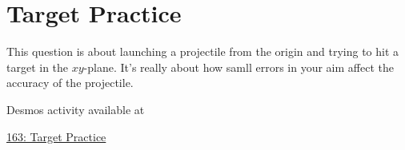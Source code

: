 \documentclass{ximera}
\begin{document}
\section{Target Practice}

\begin{question} \label{Qpdf93r}

This question is about launching a projectile from the origin and trying to hit a target in the $xy$-plane. It's really about how samll errors in your aim affect the accuracy of the projectile.

\begin{onlineOnly}
    \begin{center}
\end{center}
\end{onlineOnly}

Desmos activity available at

\href{https://www.desmos.com/3d/o9dwgzpj1l}{163: Target Practice}

\end{question}
\end{document}
